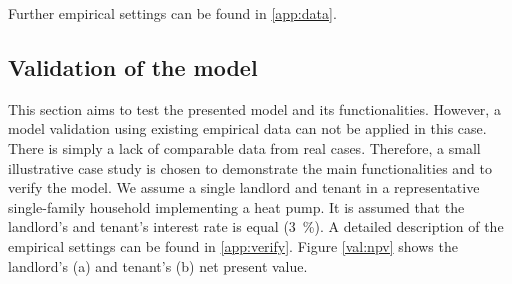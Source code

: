 \begin{table}[h]
	\centering
	\caption{Empirical settings of the data with a temporal development between $2020$ and $2040$}
	\label{tab:time}
\end{table}

Further empirical settings can be found in \ref{app:data}.

\subsection{Validation of the model}\label{met:validate}
This section aims to test the presented model and its functionalities. However, a model validation using existing empirical data can not be applied in this case. There is simply a lack of comparable data from real cases. Therefore, a small illustrative case study is chosen to demonstrate the main functionalities and to verify the model. We assume a single landlord and tenant in a representative single-family household implementing a heat pump. It is assumed that the landlord's and tenant's interest rate is equal (\SI{3}{\%}). A detailed description of the empirical settings can be found in \ref{app:verify}. Figure \ref{val:npv} shows the landlord's (a) and tenant's (b) net present value. 

